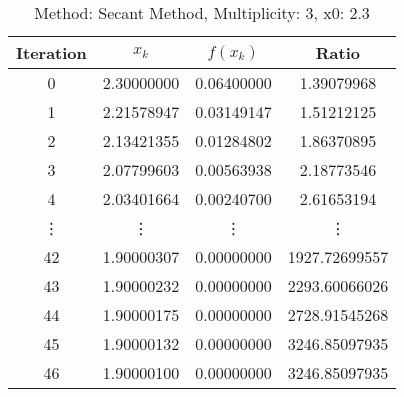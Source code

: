 \begin{table}
\centering
\caption{Method: Secant Method, Multiplicity: 3, x0: 2.3}
\label{tab:table_Secant_Method_3_2_3}
\begin{tabular}{c c c c}
\toprule
Iteration &      $x_k$ &   $f(x_k)$ &         Ratio \\
\midrule
        0 & 2.30000000 & 0.06400000 &    1.39079968 \\
        1 & 2.21578947 & 0.03149147 &    1.51212125 \\
        2 & 2.13421355 & 0.01284802 &    1.86370895 \\
        3 & 2.07799603 & 0.00563938 &    2.18773546 \\
        4 & 2.03401664 & 0.00240700 &    2.61653194 \\
   \vdots &     \vdots &     \vdots &        \vdots \\
       42 & 1.90000307 & 0.00000000 & 1927.72699557 \\
       43 & 1.90000232 & 0.00000000 & 2293.60066026 \\
       44 & 1.90000175 & 0.00000000 & 2728.91545268 \\
       45 & 1.90000132 & 0.00000000 & 3246.85097935 \\
       46 & 1.90000100 & 0.00000000 & 3246.85097935 \\
\bottomrule
\end{tabular}
\end{table}
